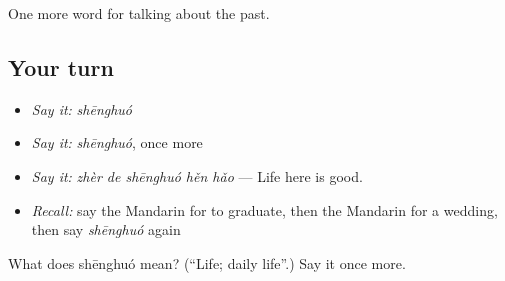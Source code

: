 \begin{grammarlens}[title={What you've built}]
One more word for talking about the past.
\end{grammarlens}

\subsection*{Your turn}
\begin{itemize}
\raggedright
  \item \emph{Say it:} \emph{shēnghuó}
  \item \emph{Say it:} \emph{shēnghuó}, once more
  \item \emph{Say it:} \emph{zhèr de shēnghuó hěn hǎo} — Life here is good.
  \item \emph{Recall:} say the Mandarin for to graduate, then the Mandarin for a wedding, then say \emph{shēnghuó} again
\end{itemize}

\begin{tcolorbox}[breakable,colback=teal!4,colframe=teal!35!black,title={Before you move on}]
What does shēnghuó mean? (\textquotedblleft{}Life; daily life\textquotedblright{}.) Say it once more.
\end{tcolorbox}
